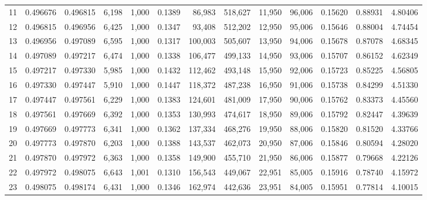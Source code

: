 \begin{tabular}{rrrrrrrrrrrrr}
11  &  0.496676 &  0.496815 &  6,198 &  1,000 &                                     0.1389 &   86,983 &  518,627 &   11,950 &   96,006 &  0.15620 &  0.88931 &  4.80406 \\
12  &  0.496815 &  0.496956 &  6,425 &  1,000 &                                     0.1347 &   93,408 &  512,202 &   12,950 &   95,006 &  0.15646 &  0.88004 &  4.74454 \\
13  &  0.496956 &  0.497089 &  6,595 &  1,000 &                                     0.1317 &  100,003 &  505,607 &   13,950 &   94,006 &  0.15678 &  0.87078 &  4.68345 \\
14  &  0.497089 &  0.497217 &  6,474 &  1,000 &                                     0.1338 &  106,477 &  499,133 &   14,950 &   93,006 &  0.15707 &  0.86152 &  4.62349 \\
15  &  0.497217 &  0.497330 &  5,985 &  1,000 &                                     0.1432 &  112,462 &  493,148 &   15,950 &   92,006 &  0.15723 &  0.85225 &  4.56805 \\
16  &  0.497330 &  0.497447 &  5,910 &  1,000 &                                     0.1447 &  118,372 &  487,238 &   16,950 &   91,006 &  0.15738 &  0.84299 &  4.51330 \\
17  &  0.497447 &  0.497561 &  6,229 &  1,000 &                                     0.1383 &  124,601 &  481,009 &   17,950 &   90,006 &  0.15762 &  0.83373 &  4.45560 \\
18  &  0.497561 &  0.497669 &  6,392 &  1,000 &                                     0.1353 &  130,993 &  474,617 &   18,950 &   89,006 &  0.15792 &  0.82447 &  4.39639 \\
19  &  0.497669 &  0.497773 &  6,341 &  1,000 &                                     0.1362 &  137,334 &  468,276 &   19,950 &   88,006 &  0.15820 &  0.81520 &  4.33766 \\
20  &  0.497773 &  0.497870 &  6,203 &  1,000 &                                     0.1388 &  143,537 &  462,073 &   20,950 &   87,006 &  0.15846 &  0.80594 &  4.28020 \\
21  &  0.497870 &  0.497972 &  6,363 &  1,000 &                                     0.1358 &  149,900 &  455,710 &   21,950 &   86,006 &  0.15877 &  0.79668 &  4.22126 \\
22  &  0.497972 &  0.498075 &  6,643 &  1,001 &                                     0.1310 &  156,543 &  449,067 &   22,951 &   85,005 &  0.15916 &  0.78740 &  4.15972 \\
23  &  0.498075 &  0.498174 &  6,431 &  1,000 &                                     0.1346 &  162,974 &  442,636 &   23,951 &   84,005 &  0.15951 &  0.77814 &  4.10015 \\

\end{tabular}
